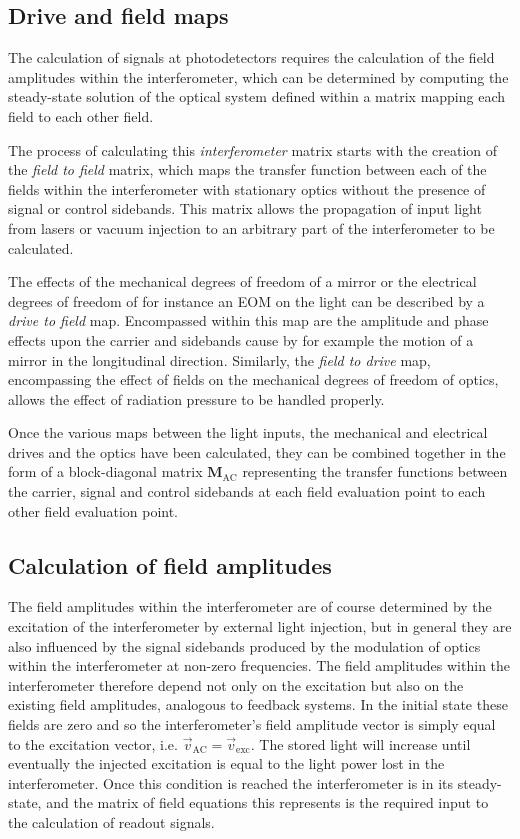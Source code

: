 \subsection{Drive and field maps}
The calculation of signals at photodetectors requires the calculation of the field amplitudes within the interferometer, which can be determined by computing the steady-state solution of the optical system defined within a matrix mapping each field to each other field.

The process of calculating this \emph{interferometer} matrix starts with the creation of the \emph{field to field} matrix, which maps the transfer function between each of the fields within the interferometer with stationary optics without the presence of signal or control sidebands. This matrix allows the propagation of input light from lasers or vacuum injection to an arbitrary part of the interferometer to be calculated.

The effects of the mechanical degrees of freedom of a mirror or the electrical degrees of freedom of for instance an \gls{EOM} on the light can be described by a \emph{drive to field} map. Encompassed within this map are the amplitude and phase effects upon the carrier and sidebands cause by for example the motion of a mirror in the longitudinal direction. Similarly, the \emph{field to drive} map, encompassing the effect of fields on the mechanical degrees of freedom of optics, allows the effect of radiation pressure to be handled properly.

Once the various maps between the light inputs, the mechanical and electrical drives and the optics have been calculated, they can be combined together in the form of a block-diagonal matrix $\mathbf{M}_{\text{AC}}$ representing the transfer functions between the carrier, signal and control sidebands at each field evaluation point to each other field evaluation point.

\subsection{Calculation of field amplitudes}
The field amplitudes within the interferometer are of course determined by the excitation of the interferometer by external light injection, but in general they are also influenced by the signal sidebands produced by the modulation of optics within the interferometer at non-zero frequencies. The field amplitudes within the interferometer therefore depend not only on the excitation but also on the existing field amplitudes, analogous to feedback systems. In the initial state these fields are zero and so the interferometer's field amplitude vector is simply equal to the excitation vector, i.e. $\vec{v}_{\text{AC}} = \vec{v}_{\text{exc}}$. The stored light will increase until eventually the injected excitation is equal to the light power lost in the interferometer. Once this condition is reached the interferometer is in its steady-state, and the matrix of field equations this represents is the required input to the calculation of readout signals.

